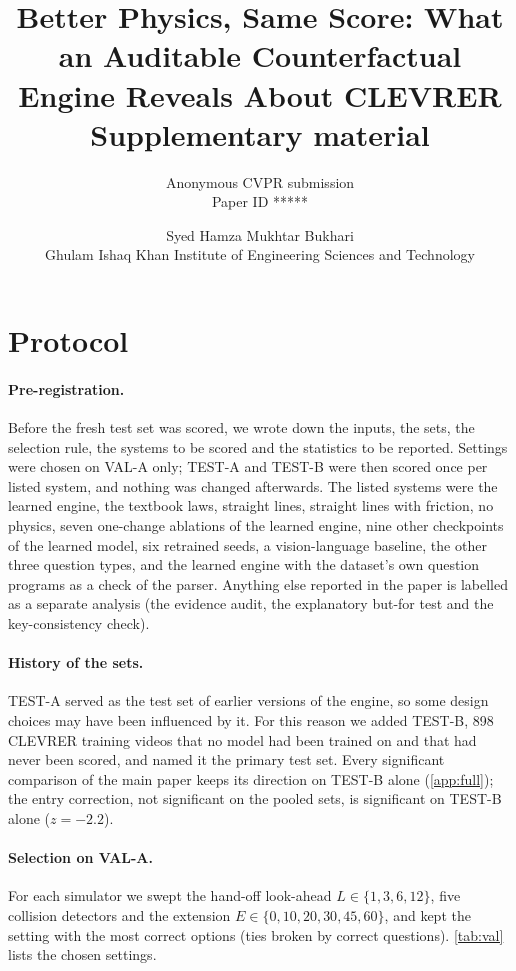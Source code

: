 \documentclass[10pt,onecolumn,letterpaper]{article}
\title{Better Physics, Same Score: What an Auditable Counterfactual Engine Reveals About CLEVRER\\[4pt]\large Supplementary material}
\author{Anonymous CVPR submission\\ Paper ID *****}
\author{Syed Hamza Mukhtar Bukhari\\
Ghulam Ishaq Khan Institute of Engineering Sciences and Technology}
\date{}
\begin{document}
\maketitle

\section{Protocol}
\label{app:prereg}

\paragraph{Pre-registration.}
Before the fresh test set was scored, we wrote down the inputs, the sets, the selection rule, the systems to be scored and the statistics to be reported.
Settings were chosen on VAL-A only; TEST-A and TEST-B were then scored once per listed system, and nothing was changed afterwards.
The listed systems were the learned engine, the textbook laws, straight lines, straight lines with friction, no physics, seven one-change ablations of the learned engine, nine other checkpoints of the learned model, six retrained seeds, a vision-language baseline, the other three question types, and the learned engine with the dataset's own question programs as a check of the parser.
Anything else reported in the paper is labelled as a separate analysis (the evidence audit, the explanatory but-for test and the key-consistency check).

\paragraph{History of the sets.}
TEST-A served as the test set of earlier versions of the engine, so some design choices may have been influenced by it.
For this reason we added TEST-B, 898 CLEVRER training videos that no model had been trained on and that had never been scored, and named it the primary test set.
Every significant comparison of the main paper keeps its direction on TEST-B alone (\cref{app:full}); the entry correction, not significant on the pooled sets, is significant on TEST-B alone ($z=-2.2$).

\paragraph{Selection on VAL-A.}
For each simulator we swept the hand-off look-ahead $L \in \{1,3,6,12\}$, five collision detectors and the extension $E \in \{0,10,20,30,45,60\}$, and kept the setting with the most correct options (ties broken by correct questions).
\cref{tab:val} lists the chosen settings.
\end{document}

